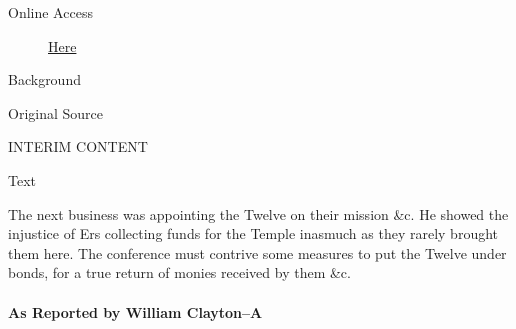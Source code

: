 				\begin{description}
					\item[Online Access] \href{https://www.josephsmithpapers.org/paper-summary/discourse-6-april-1843-a-as-reported-by-william-clayton/1}{Here}
				\end{description}
				
				\begin{description}
					\item[Background]
				\end{description}
				
				
				\begin{description}
					\item[Original Source]
				\end{description}
				
					INTERIM CONTENT
					
				
				\begin{description}
					\item[Text]
				\end{description}
				
					The next business was appointing the Twelve on their mission \&c. He showed the injustice of Ers collecting funds for the Temple inasmuch as they rarely brought them here. The conference must contrive some measures to put the Twelve under bonds, for a true return of monies received by them \&c.
					
			\paragraph{As Reported by William Clayton--A}
				\label{EMS-1843-JS-6-8-APR-1843-WC-A}
			
